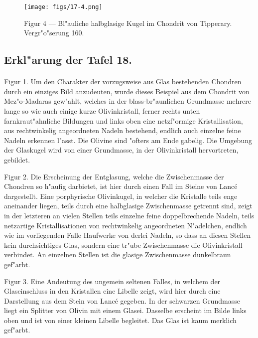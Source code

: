 \documentclass[a4paper, 11pt, oneside, polutonikogreek, german]{article}
\begin{document}
\vspace*{\fill}
\begin{figure}[H]
\centering
\texttt{[image: figs/17-4.png]}
\caption{\small Figur 4 --- Bl"auliche halbglasige Kugel im Chondrit von Tipperary. Vergr"o"serung 160.}
\end{figure}
\vspace*{\fill}
\clearpage

\subsection{Erkl"arung der Tafel 18.}
\paragraph{}
Figur 1. Um den Charakter der vorzugsweise aus Glas bestehenden Chondren durch ein einziges Bild anzudeuten, wurde dieses Beispiel aus dem Chondrit von Mez"o-Madaras gew"ahlt, welches in der blass-br"aunlichen Grundmasse mehrere lange so wie auch einige kurze Olivinkristall, ferner rechts unten farnkraut"ahnliche Bildungen und links oben eine netzf"ormige Kristallisation, aus rechtwinkelig angeordneten Nadeln bestehend, endlich auch einzelne feine Nadeln erkennen l"asst. Die Olivine sind "ofters am Ende gabelig. Die Umgebung der Glaskugel wird von einer Grundmasse, in der Olivinkristall hervortreten, gebildet.

Figur 2. Die Erscheinung der Entglasung, welche die Zwischenmasse der Chondren so h"aufig darbietet, ist hier durch einen Fall im Steine von Lancé dargestellt. Eine porphyrische Olivinkugel, in welcher die Kristalle teils enge aneinander liegen, teils durch eine halbglasige Zwischenmasse getrennt sind, zeigt in der letzteren an vielen Stellen teils einzelne feine doppelbrechende Nadeln, teils netzartige Kristallisationen von rechtwinkelig angeordneten N"adelchen, endlich wie im vorliegenden Falle Haufwerke von derlei Nadeln, so dass an diesen Stellen kein durchsichtiges Glas, sondern eine tr"ube Zwischenmasse die Olivinkristall verbindet. An einzelnen Stellen ist die glasige Zwischenmasse dunkelbraun gef"arbt.

Figur 3. Eine Andeutung des ungemein seltenen Falles, in welchem der Glaseinschluss in den Kristallen eine Libelle zeigt, wird hier durch eine Darstellung aus dem Stein von Lancé gegeben. In der schwarzen Grundmasse liegt ein Splitter von Olivin mit einem Glasei. Dasselbe erscheint im Bilde links oben und ist von einer kleinen Libelle begleitet. Das Glas ist kaum merklich gef"arbt.
\end{document}

